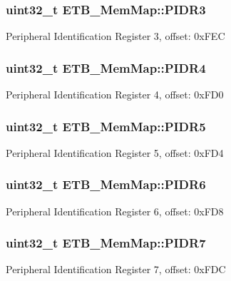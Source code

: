 \subsubsection[{P\+I\+D\+R3}]{\setlength{\rightskip}{0pt plus 5cm}uint32\+\_\+t E\+T\+B\+\_\+\+Mem\+Map\+::\+P\+I\+D\+R3}\label{struct_e_t_b___mem_map_aca8df6dc059f2ca8eb432f2f74a09149}
Peripheral Identification Register 3, offset\+: 0x\+F\+E\+C \hypertarget{struct_e_t_b___mem_map_aab4e4aba29d9ec426e0f2e218903a4f0}{}
\subsubsection[{P\+I\+D\+R4}]{\setlength{\rightskip}{0pt plus 5cm}uint32\+\_\+t E\+T\+B\+\_\+\+Mem\+Map\+::\+P\+I\+D\+R4}\label{struct_e_t_b___mem_map_aab4e4aba29d9ec426e0f2e218903a4f0}
Peripheral Identification Register 4, offset\+: 0x\+F\+D0 \hypertarget{struct_e_t_b___mem_map_a29dbd40dd92aaf2fc1674f9f38ef1a5e}{}
\subsubsection[{P\+I\+D\+R5}]{\setlength{\rightskip}{0pt plus 5cm}uint32\+\_\+t E\+T\+B\+\_\+\+Mem\+Map\+::\+P\+I\+D\+R5}\label{struct_e_t_b___mem_map_a29dbd40dd92aaf2fc1674f9f38ef1a5e}
Peripheral Identification Register 5, offset\+: 0x\+F\+D4 \hypertarget{struct_e_t_b___mem_map_aa7b42abfbe48ecbae7727e614304f2e5}{}
\subsubsection[{P\+I\+D\+R6}]{\setlength{\rightskip}{0pt plus 5cm}uint32\+\_\+t E\+T\+B\+\_\+\+Mem\+Map\+::\+P\+I\+D\+R6}\label{struct_e_t_b___mem_map_aa7b42abfbe48ecbae7727e614304f2e5}
Peripheral Identification Register 6, offset\+: 0x\+F\+D8 \hypertarget{struct_e_t_b___mem_map_afe2e7e50c2713a52cce9a89e6dcb0e1c}{}
\subsubsection[{P\+I\+D\+R7}]{\setlength{\rightskip}{0pt plus 5cm}uint32\+\_\+t E\+T\+B\+\_\+\+Mem\+Map\+::\+P\+I\+D\+R7}\label{struct_e_t_b___mem_map_afe2e7e50c2713a52cce9a89e6dcb0e1c}
Peripheral Identification Register 7, offset\+: 0x\+F\+D\+C \hypertarget{struct_e_t_b___mem_map_a1c10bbda4ba1bbe562b76e90bcb1bc61}{}
